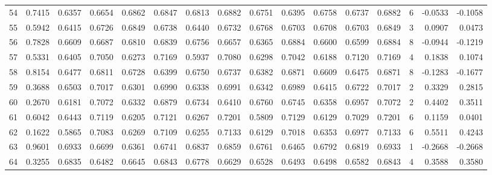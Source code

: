\begin{tabular}{lrrrrrrrrrrrrrrr}
54  &      0.7415 &  0.6357 &  0.6654 &  0.6862 &  0.6847 &  0.6813 &  0.6882 &  0.6751 &  0.6395 &  0.6758 &   0.6737 &     0.6882 &      6 &                   -0.0533 &                    -0.1058 \\
55  &      0.5942 &  0.6415 &  0.6726 &  0.6849 &  0.6738 &  0.6440 &  0.6732 &  0.6768 &  0.6703 &  0.6708 &   0.6703 &     0.6849 &      3 &                    0.0907 &                     0.0473 \\
56  &      0.7828 &  0.6609 &  0.6687 &  0.6810 &  0.6839 &  0.6756 &  0.6657 &  0.6365 &  0.6884 &  0.6600 &   0.6599 &     0.6884 &      8 &                   -0.0944 &                    -0.1219 \\
57  &      0.5331 &  0.6405 &  0.7050 &  0.6273 &  0.7169 &  0.5937 &  0.7080 &  0.6298 &  0.7042 &  0.6188 &   0.7120 &     0.7169 &      4 &                    0.1838 &                     0.1074 \\
58  &      0.8154 &  0.6477 &  0.6811 &  0.6728 &  0.6399 &  0.6750 &  0.6737 &  0.6382 &  0.6871 &  0.6609 &   0.6475 &     0.6871 &      8 &                   -0.1283 &                    -0.1677 \\
59  &      0.3688 &  0.6503 &  0.7017 &  0.6301 &  0.6990 &  0.6338 &  0.6991 &  0.6342 &  0.6989 &  0.6415 &   0.6722 &     0.7017 &      2 &                    0.3329 &                     0.2815 \\
60  &      0.2670 &  0.6181 &  0.7072 &  0.6332 &  0.6879 &  0.6734 &  0.6410 &  0.6760 &  0.6745 &  0.6358 &   0.6957 &     0.7072 &      2 &                    0.4402 &                     0.3511 \\
61  &      0.6042 &  0.6443 &  0.7119 &  0.6205 &  0.7121 &  0.6267 &  0.7201 &  0.5809 &  0.7129 &  0.6129 &   0.7029 &     0.7201 &      6 &                    0.1159 &                     0.0401 \\
62  &      0.1622 &  0.5865 &  0.7083 &  0.6269 &  0.7109 &  0.6255 &  0.7133 &  0.6129 &  0.7018 &  0.6353 &   0.6977 &     0.7133 &      6 &                    0.5511 &                     0.4243 \\
63  &      0.9601 &  0.6933 &  0.6699 &  0.6361 &  0.6741 &  0.6837 &  0.6859 &  0.6761 &  0.6465 &  0.6792 &   0.6819 &     0.6933 &      1 &                   -0.2668 &                    -0.2668 \\
64  &      0.3255 &  0.6835 &  0.6482 &  0.6645 &  0.6843 &  0.6778 &  0.6629 &  0.6528 &  0.6493 &  0.6498 &   0.6582 &     0.6843 &      4 &                    0.3588 &                     0.3580 \\

\end{tabular}
